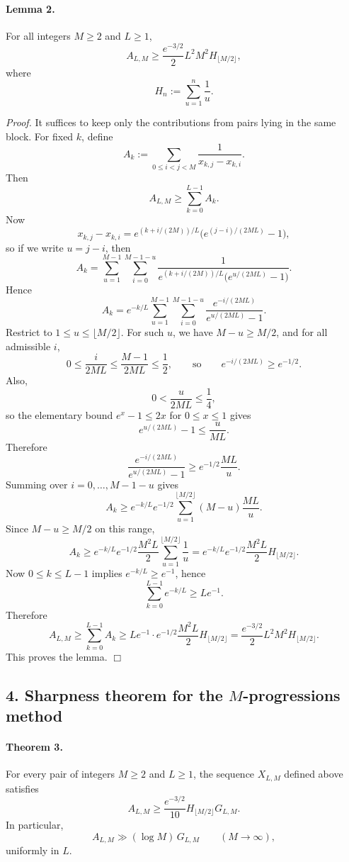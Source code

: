 \paragraph{Lemma 2.}
For all integers \(M\ge 2\) and \(L\ge 1\),
\[
A_{L,M}
\ge
\frac{e^{-3/2}}{2}
L^2M^2H_{\lfloor M/2\rfloor},
\]
where
\[
H_n:=\sum_{u=1}^{n}\frac1u.
\]

\emph{Proof.}
It suffices to keep only the contributions from pairs lying in the same block. For fixed \(k\), define
\[
A_k:=\sum_{0\le i<j<M}\frac{1}{x_{k,j}-x_{k,i}}.
\]
Then
\[
A_{L,M}\ge \sum_{k=0}^{L-1}A_k.
\]
Now
\[
x_{k,j}-x_{k,i}=e^{(k+i/(2M))/L}\bigl(e^{(j-i)/(2ML)}-1\bigr),
\]
so if we write \(u=j-i\), then
\[
A_k
=
\sum_{u=1}^{M-1}\sum_{i=0}^{M-1-u}
\frac{1}{e^{(k+i/(2M))/L}\bigl(e^{u/(2ML)}-1\bigr)}.
\]
Hence
\[
A_k
=e^{-k/L}
\sum_{u=1}^{M-1}\sum_{i=0}^{M-1-u}
\frac{e^{-i/(2ML)}}{e^{u/(2ML)}-1}.
\]
Restrict to \(1\le u\le \lfloor M/2\rfloor\). For such \(u\), we have \(M-u\ge M/2\), and for all admissible \(i\),
\[
0\le \frac{i}{2ML}\le \frac{M-1}{2ML}\le \frac12,
\qquad\text{so}\qquad
e^{-i/(2ML)}\ge e^{-1/2}.
\]
Also,
\[
0<\frac{u}{2ML}\le \frac14,
\]
so the elementary bound \(e^x-1\le 2x\) for \(0\le x\le 1\) gives
\[
e^{u/(2ML)}-1\le \frac{u}{ML}.
\]
Therefore
\[
\frac{e^{-i/(2ML)}}{e^{u/(2ML)}-1}
\ge e^{-1/2}\frac{ML}{u}.
\]
Summing over \(i=0,\dots,M-1-u\) gives
\[
A_k
\ge e^{-k/L}e^{-1/2}
\sum_{u=1}^{\lfloor M/2\rfloor}(M-u)\frac{ML}{u}.
\]
Since \(M-u\ge M/2\) on this range,
\[
A_k
\ge e^{-k/L}e^{-1/2}\frac{M^2L}{2}
\sum_{u=1}^{\lfloor M/2\rfloor}\frac1u
=
 e^{-k/L}e^{-1/2}\frac{M^2L}{2}H_{\lfloor M/2\rfloor}.
\]
Now \(0\le k\le L-1\) implies \(e^{-k/L}\ge e^{-1}\), hence
\[
\sum_{k=0}^{L-1}e^{-k/L}\ge Le^{-1}.
\]
Therefore
\[
A_{L,M}
\ge
\sum_{k=0}^{L-1}A_k
\ge
Le^{-1}\cdot e^{-1/2}\frac{M^2L}{2}H_{\lfloor M/2\rfloor}
=
\frac{e^{-3/2}}{2}L^2M^2H_{\lfloor M/2\rfloor}.
\]
This proves the lemma.
\hfill\(\Box\)

\subsection*{4. Sharpness theorem for the \(M\)-progressions method}

\paragraph{Theorem 3.}
For every pair of integers \(M\ge 2\) and \(L\ge 1\), the sequence \(X_{L,M}\) defined above satisfies
\[
A_{L,M}
\ge
\frac{e^{-3/2}}{10}
H_{\lfloor M/2\rfloor}
G_{L,M}.
\]
In particular,
\[
A_{L,M}\gg (\log M)\,G_{L,M}
\qquad (M\to\infty),
\]
uniformly in \(L\).

